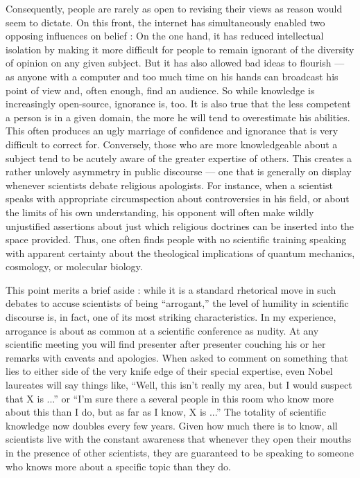 \documentclass[a4paper,14pt]{extbook}
\begin{document}
Consequently, people are rarely as open to revising their views as reason would seem to dictate.
On this front, the internet has simultaneously enabled two opposing influences on belief :
On the one hand, it has reduced intellectual isolation by making it more difficult for people to remain ignorant of the diversity of opinion on any given subject.
But it has also allowed bad ideas to flourish --- as anyone with a computer and too much time on his hands can broadcast his point of view and, often enough, find an audience.
So while knowledge is increasingly open-source, ignorance is, too.
It is also true that the less competent a person is in a given domain, the more he will tend to overestimate his abilities.
This often produces an ugly marriage of confidence and ignorance that is very difficult to correct for.
Conversely, those who are more knowledgeable about a subject tend to be acutely aware of the greater expertise of others.
This creates a rather unlovely asymmetry in public discourse --- one that is generally on display whenever scientists debate religious apologists.
For instance, when a scientist speaks with appropriate circumspection about controversies in his field, or about the limits of his own understanding, his opponent will often make wildly unjustified assertions about just which religious doctrines can be inserted into the space provided.
Thus, one often finds people with no scientific training speaking with apparent certainty about the theological implications of quantum mechanics, cosmology, or molecular biology.

This point merits a brief aside :
while it is a standard rhetorical move in such debates to accuse scientists of being ``arrogant,'' the level of humility in scientific discourse is, in fact, one of its most striking characteristics.
In my experience, arrogance is about as common at a scientific conference as nudity.
At any scientific meeting you will find presenter after presenter couching his or her remarks with caveats and apologies.
When asked to comment on something that lies to either side of the very knife edge of their special expertise, even Nobel laureates will say things like, ``Well, this isn’t really my area, but I would suspect that X is ...'' or ``I’m sure there a several people in this room who know more about this than I do, but as far as I know, X is ...''
The totality of scientific knowledge now doubles every few years.
Given how much there is to know, all scientists live with the constant awareness that whenever they open their mouths in the presence of other scientists, they are guaranteed to be speaking to someone who knows more about a specific topic than they do.
\end{document}
